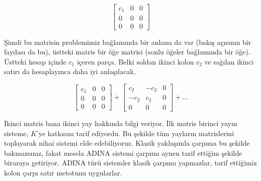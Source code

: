 \documentclass[12pt,fleqn]{article}\usepackage{../../common}
\begin{document}
$$
\left[\begin{array}{rrr}
c_1 & 0 & 0 \\ 0 & 0 & 0 \\ 0 & 0 & 0 
\end{array}\right] 
$$

Şimdi bu matrisin problemimiz bağlamında bir anlamı da var (bakış açısının bir
faydası da bu), üstteki matris bir öğe matrisi (sonlu öğeler bağlamında bir
öğe). Üstteki hesap içinde $c_1$ içeren parça. Belki soldan ikinci kolon $c_2$
ve sağdan ikinci satırı da hesaplayınca daha iyi anlaşılacak,

$$
\left[\begin{array}{rrr}
c_1 & 0 & 0 \\ 0 & 0 & 0 \\ 0 & 0 & 0 
\end{array}\right]
+
\left[\begin{array}{rrr}
c_2 & -c_2 & 0 \\ -c_2 & c_2 & 0 \\ 0 & 0 & 0 
\end{array}\right]
+ ...
$$

İkinci matris bana ikinci yay hakkında bilgi veriyor. İlk matris birinci yayın
sisteme, $K$'ye katkısını tarif ediyordu. Bu şekilde tüm yayların matrislerini
toplayarak nihai sistemi elde edebiliyoruz. Klasik yaklaşımla çarpıma bu şekilde
bakmazsınız, fakat mesela ADINA sistemi çarpımı aynen tarif ettiğim şekilde
biraraya getiriyor. ADINA türü sistemler klasik çarpımı yapmazlar, tarif
ettiğimiz kolon çarpı satır metotunu uygularlar.
\end{document}

